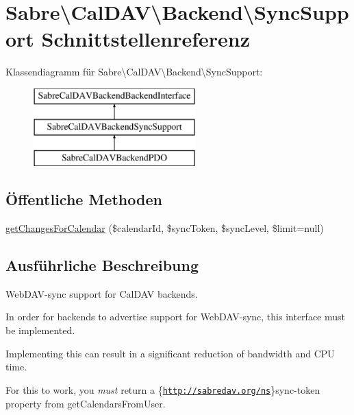 \hypertarget{interface_sabre_1_1_cal_d_a_v_1_1_backend_1_1_sync_support}{}\section{Sabre\textbackslash{}Cal\+D\+AV\textbackslash{}Backend\textbackslash{}Sync\+Support Schnittstellenreferenz}
\label{interface_sabre_1_1_cal_d_a_v_1_1_backend_1_1_sync_support}
Klassendiagramm für Sabre\textbackslash{}Cal\+D\+AV\textbackslash{}Backend\textbackslash{}Sync\+Support\+:\begin{figure}[H]
\begin{center}
\leavevmode
\includegraphics[height=3.000000cm]{interface_sabre_1_1_cal_d_a_v_1_1_backend_1_1_sync_support}
\end{center}
\end{figure}
\subsection*{Öffentliche Methoden}
\begin{DoxyCompactItemize}
\item 
\mbox{\hyperlink{interface_sabre_1_1_cal_d_a_v_1_1_backend_1_1_sync_support_abe47a53f20bbcd3f5634e1104ea84666}{get\+Changes\+For\+Calendar}} (\$calendar\+Id, \$sync\+Token, \$sync\+Level, \$limit=null)
\end{DoxyCompactItemize}


\subsection{Ausführliche Beschreibung}
Web\+D\+A\+V-\/sync support for Cal\+D\+AV backends.

In order for backends to advertise support for Web\+D\+A\+V-\/sync, this interface must be implemented.

Implementing this can result in a significant reduction of bandwidth and C\+PU time.

For this to work, you {\itshape must} return a \{\href{http://sabredav.org/ns}{\tt http\+://sabredav.\+org/ns}\}sync-\/token property from get\+Calendars\+From\+User.

